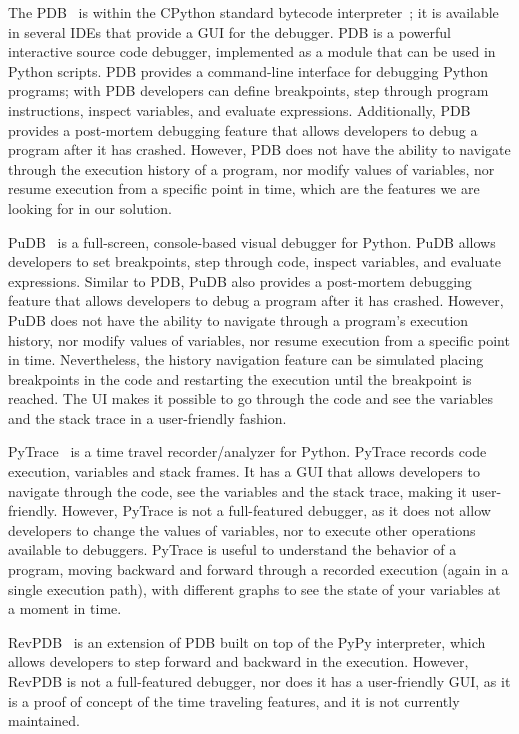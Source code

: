 The \ac{PDB}~\cite{python-pdb}  is within the CPython
 standard  bytecode interpreter~\cite{shaw21}; it is available in several IDEs that provide a \ac{GUI} for 
the debugger. \ac{PDB} is a powerful interactive source code debugger, 
implemented as a module that can be used in Python scripts. \ac{PDB} provides a command-line 
interface for debugging Python programs; with \ac{PDB} developers can define breakpoints, step through 
program instructions, inspect variables, and evaluate expressions. Additionally, \ac{PDB} provides 
a post-mortem debugging feature that allows developers to debug a program after it has crashed. 
However, \ac{PDB} does not have the ability to navigate through the execution history of a program, nor
modify values of variables, nor resume execution from a specific point in time, which are the features 
we are looking for in our solution. 

PuDB~\cite{pudb} is a full-screen, console-based visual debugger for Python. PuDB allows 
developers to set breakpoints, step through code, inspect variables, and evaluate expressions. 
Similar to \ac{PDB}, PuDB also provides a post-mortem debugging feature that allows developers to 
debug a program after it has crashed. However, PuDB does not have the ability to navigate through 
a program's execution history, nor modify values of variables, nor resume execution from a specific point 
in time. Nevertheless, the history navigation feature can be simulated placing breakpoints in the 
code and restarting the execution until the breakpoint is reached. The UI makes it possible to go 
through the code and see the variables and the stack trace in a user-friendly fashion.

PyTrace~\cite{pytrace} is a time travel recorder/analyzer for Python. PyTrace records code execution, 
variables and stack frames. It has a \ac{GUI} that allows developers to navigate through the code, 
see the variables and the stack trace, making it user-friendly. However, PyTrace is not 
a full-featured debugger, as it does not allow developers to change the values of variables, nor to 
execute other operations available to debuggers. PyTrace is useful to understand the behavior of 
a program, moving backward and forward through a recorded execution (again in a single execution 
path),  with different  graphs to see the state of your variables at a moment in time.

\ac{RevPDB}~\cite{revdeb} is an extension of 
\ac{PDB} built on top of the PyPy interpreter, which allows developers to step forward and backward in 
the execution. However, RevPDB is not a full-featured debugger, nor does it has a user-friendly GUI, 
as it is a proof of concept of the time traveling features, and it is not currently maintained.

